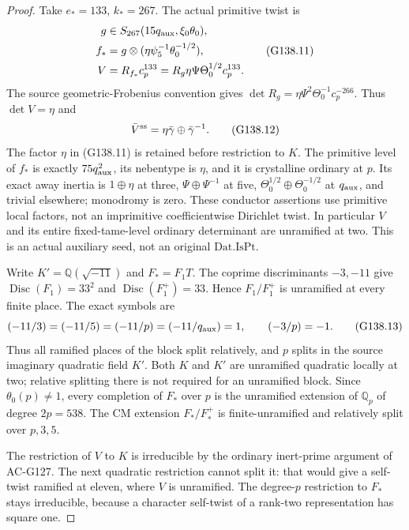 \begin{proof}
Take \(e_*=133\), \(k_*=267\).  The actual primitive twist is
\[
 \begin{split}
 g&\in S_{267}(15q_{\rm aux},\xi_0\theta_0),\\
 f_*&=g\otimes(\eta\psi_5^{-1}\theta_0^{-1/2}),\\
 V&=R_{f_*}c_p^{133}
    =R_g\eta\Psi\Theta_0^{1/2}c_p^{133}.
 \end{split}
 \tag{G138.11}
\]
The source geometric-Frobenius convention gives
\(\det R_g=\eta\Psi^2\Theta_0^{-1}c_p^{-266}\).
Thus \(\det V=\eta\) and
\[
 \bar V^{\rm ss}=\eta\bar\gamma\oplus\bar\gamma^{-1}.
 \tag{G138.12}
\]
The factor \(\eta\) in (G138.11) is retained before restriction
to \(K\).  The primitive level of \(f_*\) is exactly
\(75q_{\rm aux}^2\), its nebentype is \(\eta\), and it is
crystalline ordinary at \(p\).  Its exact away inertia is
\(1\oplus\eta\) at three, \(\Psi\oplus\Psi^{-1}\) at five,
\(\Theta_0^{1/2}\oplus\Theta_0^{-1/2}\) at \(q_{\rm aux}\),
and trivial elsewhere; monodromy is zero.  These conductor
assertions use primitive local factors, not an imprimitive
coefficientwise Dirichlet twist.  In particular \(V\) and its
entire fixed-tame-level ordinary determinant are unramified at two.
This is an actual auxiliary seed, not an original
\(\mathrm{Dat.IsPt}\).

Write \(K'=\mathbb Q(\sqrt{-11})\) and \(F_*=F_1T\).
The coprime discriminants \(-3,-11\) give
\(\operatorname{Disc}(F_1)=33^2\) and
\(\operatorname{Disc}(F_1^+)=33\).  Hence \(F_1/F_1^+\)
is unramified at every finite place.
The exact symbols are
\[
 (-11/3)=(-11/5)=(-11/p)=(-11/q_{\rm aux})=1,
 \qquad (-3/p)=-1.
 \tag{G138.13}
\]
Thus all ramified places of the block split relatively, and
\(p\) splits in the source imaginary quadratic field \(K'\).
Both \(K\) and \(K'\) are unramified quadratic locally at two;
relative splitting there is not required for an unramified block.
Since \(\theta_0(p)\ne1\), every completion of \(F_*\) over
\(p\) is the unramified extension of \(\mathbb Q_p\) of
degree \(2p=538\).  The CM extension \(F_*/F_*^+\) is
finite-unramified and relatively split over \(p,3,5\).

The restriction of \(V\) to \(K\) is irreducible by the
ordinary inert-prime argument of AC-G127.  The next quadratic
restriction cannot split it: that would give a self-twist
ramified at eleven, where \(V\) is unramified.  The degree-\(p\)
restriction to \(F_*\) stays irreducible, because a character
self-twist of a rank-two representation has square one.


\end{proof}
